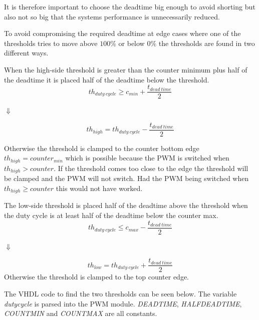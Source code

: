 It is therefore important to choose the deadtime big enough to avoid shorting but also not so big that the systems performance is unnecessarily reduced.
\bigskip


To avoid compromising the required deadtime at edge cases where one of the thresholds tries to move above $100 \%$ or  below $0 \%$ the thresholds are found in two different ways.





When the high-side threshold is greater than the counter minimum plus half of the deadtime it is placed half of the deadtime below the threshold.
\begin{equation}
    th_{duty \ cycle} \geq  c_{min} + \frac{t_{dead \ time}}{2}
    \label{eq:threshold_high_condition}
\end{equation}
\begin{center}
    $\Downarrow$    
\end{center}
\begin{equation}
   th_{high} = th_{duty \ cycle} - \frac{t_{dead \ time}}{2}  
   \label{eq:threshold_high_equation}
\end{equation}

Otherwise the threshold is clamped to the counter bottom edge $th_{high} = counter_{min}$ which is possible because the PWM is switched when $th_{high} > counter$.
If the threshold comes too close to the edge the threshold will be clamped and the PWM will not switch. Had the PWM being switched when $th_{high} \geq counter$ this would not have worked.



The low-side threshold is placed half of the deadtime above the threshold when the duty cycle is at least half of the deadtime below the counter max.
\begin{equation}
    th_{duty \ cycle}\leq c_{max} - \frac{t_{dead \ time}}{2}
    \label{eq:threshold_low_condition}
\end{equation}
\begin{center}
    $\Downarrow$
\end{center}
\begin{equation}
  th_{low} = th_{duty \ cycle} + \frac{t_{dead \ time}}{2}  
  \label{eq:threshold_low_equation}
\end{equation}
Otherwise the threshold is clamped to the top counter edge.

The VHDL code to find the two thresholds can be seen below. The variable \textit{duty\textunderscore cycle} is parsed into the PWM module. \textit{DEADTIME}, \textit{HALF\textunderscore DEADTIME}, \textit{COUNT\textunderscore MIN} and \textit{COUNT\textunderscore MAX} are all constants.

